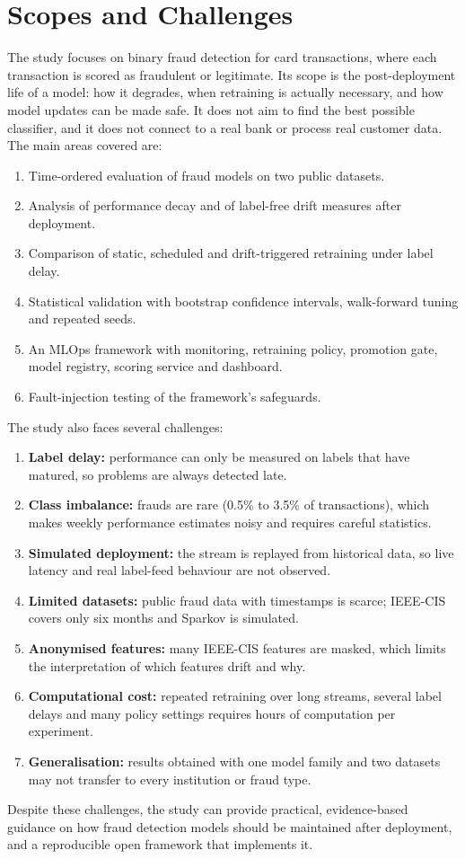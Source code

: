 \section{Scopes and Challenges}

The study focuses on binary fraud detection for card transactions, where each transaction is scored as fraudulent or legitimate. Its scope is the post-deployment life of a model: how it degrades, when retraining is actually necessary, and how model updates can be made safe. It does not aim to find the best possible classifier, and it does not connect to a real bank or process real customer data. The main areas covered are:

\begin{enumerate}
  \item Time-ordered evaluation of fraud models on two public datasets.
  \item Analysis of performance decay and of label-free drift measures after deployment.
  \item Comparison of static, scheduled and drift-triggered retraining under label delay.
  \item Statistical validation with bootstrap confidence intervals, walk-forward tuning and repeated seeds.
  \item An MLOps framework with monitoring, retraining policy, promotion gate, model registry, scoring service and dashboard.
  \item Fault-injection testing of the framework's safeguards.
\end{enumerate}

The study also faces several challenges:

\begin{enumerate}
  \item \textbf{Label delay:} performance can only be measured on labels that have matured, so problems are always detected late.
  \item \textbf{Class imbalance:} frauds are rare (0.5\% to 3.5\% of transactions), which makes weekly performance estimates noisy and requires careful statistics.
  \item \textbf{Simulated deployment:} the stream is replayed from historical data, so live latency and real label-feed behaviour are not observed.
  \item \textbf{Limited datasets:} public fraud data with timestamps is scarce; IEEE-CIS covers only six months and Sparkov is simulated.
  \item \textbf{Anonymised features:} many IEEE-CIS features are masked, which limits the interpretation of which features drift and why.
  \item \textbf{Computational cost:} repeated retraining over long streams, several label delays and many policy settings requires hours of computation per experiment.
  \item \textbf{Generalisation:} results obtained with one model family and two datasets may not transfer to every institution or fraud type.
\end{enumerate}

Despite these challenges, the study can provide practical, evidence-based guidance on how fraud detection models should be maintained after deployment, and a reproducible open framework that implements it.
